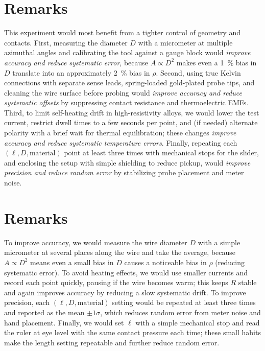 \documentclass[12pt]{article}
\numberwithin{equation}{section}
\begin{document}
\section*{Remarks}
This experiment would most benefit from a tighter control of geometry and contacts. First, measuring the diameter $D$ with a micrometer at multiple azimuthal angles and calibrating the tool against a gauge block would \emph{improve accuracy and reduce systematic error}, because $A\propto D^{2}$ makes even a \SI{1}{\percent} bias in $D$ translate into an approximately \SI{2}{\percent} bias in $\rho$. Second, using true Kelvin connections with separate sense leads, spring-loaded gold-plated probe tips, and cleaning the wire surface before probing would \emph{improve accuracy and reduce systematic offsets} by suppressing contact resistance and thermoelectric EMFs. Third, to limit self-heating drift in high-resistivity alloys, we would lower the test current, restrict dwell times to a few seconds per point, and (if needed) alternate polarity with a brief wait for thermal equilibration; these changes \emph{improve accuracy and reduce systematic temperature errors}. Finally, repeating each $(\ell,D,\text{material})$ point at least three times with mechanical stops for the slider, and enclosing the setup with simple shielding to reduce pickup, would \emph{improve precision and reduce random error} by stabilizing probe placement and meter noise.

\section*{Remarks}
To improve accuracy, we would measure the wire diameter $D$ with a simple micrometer at several places along the wire and take the average, because $A\propto D^{2}$ means even a small bias in $D$ causes a noticeable bias in $\rho$ (reducing systematic error). To avoid heating effects, we would use smaller currents and record each point quickly, pausing if the wire becomes warm; this keeps $R$ stable and again improves accuracy by reducing a slow systematic drift. To improve precision, each $(\ell,D,\text{material})$ setting would be repeated at least three times and reported as the mean $\pm 1\sigma$, which reduces random error from meter noise and hand placement. Finally, we would set $\ell$ with a simple mechanical stop and read the ruler at eye level with the same contact pressure each time; these small habits make the length setting repeatable and further reduce random error.
\end{document}
